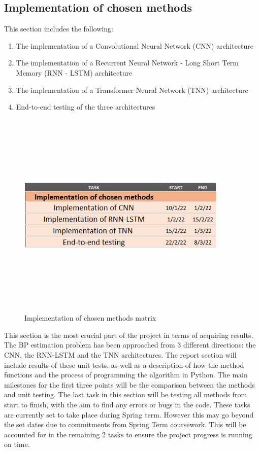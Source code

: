 \documentclass[11pt, a4paper]{article}
\begin{document}
\subsection{Implementation of chosen methods}
This section includes the following:
\begin{enumerate}
    \item The implementation of a Convolutional Neural Network (CNN) architecture    
    \item The implementation of a Recurrent Neural Network - Long Short Term Memory (RNN - LSTM) architecture
    \item The implementation of a Transformer Neural Network (TNN) architecture
    \item End-to-end testing of the three architectures
\end{enumerate}\begin{figure}[H]
    \centering
    \includegraphics[width=10cm,height=10cm,keepaspectratio]{Figures/part2_gantt.png}
    \caption{Implementation of chosen methods matrix}
    \label{gantt2}
\end{figure} \noindent This section is the most crucial part of the project in terms of acquiring results. The BP estimation problem has been approached from 3 different directions: the CNN, the RNN-LSTM and the TNN architectures. The report section will include results of these unit tests, as well as a description of how the method functions and the process of programming the algorithm in Python. The main milestones for the first three points will be the comparison between the methods and unit testing. The last task in this section will be testing all methods from start to finish, with the aim to find any errors or bugs in the code. These tasks are currently set to take place during Spring term. However this may go beyond the set dates due to commitments from Spring Term coursework. This will be accounted for in the remaining 2 tasks to ensure the project progress is running on time.
\end{document}
